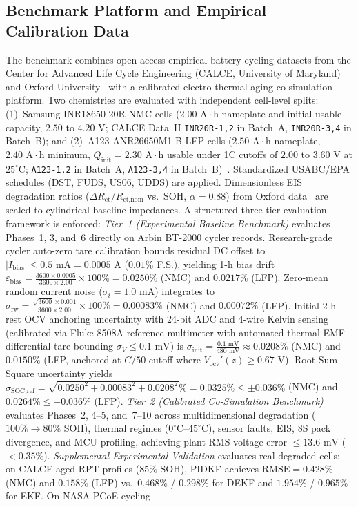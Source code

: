 \documentclass[balance,nocopyright,upint,varvw,hyphenate,barcolor=NavyBlue,nolists]{asmejour}
\begin{document}
\subsection{Benchmark Platform and Empirical Calibration Data}
The benchmark combines open-access empirical battery cycling datasets from the Center for Advanced Life Cycle Engineering (CALCE, University of Maryland)~\cite{Pecht2011calce} and Oxford University~\cite{Birkl2017diagnostics} with a calibrated electro-thermal-aging co-simulation platform. Two chemistries are evaluated with independent cell-level splits: (1)~Samsung INR18650-20R NMC cells ($2.00\text{ A}\cdot\text{h}$ nameplate and initial usable capacity, $2.50$ to $4.20\text{ V}$; CALCE Data~II \texttt{INR20R-1,2} in Batch~A, \texttt{INR20R-3,4} in Batch~B); and (2)~A123 ANR26650M1-B LFP cells ($2.50\text{ A}\cdot\text{h}$ nameplate, $2.40\text{ A}\cdot\text{h}$ minimum, $Q_{\text{init}} = \allowbreak 2.30\text{ A}\cdot\text{h}$ usable under 1C cutoffs of $2.00$ to $3.60\text{ V}$ at $25^\circ\text{C}$; \texttt{A123-1,2} in Batch~A, \texttt{A123-3,4} in Batch~B)~\cite{He2011ecm,Pecht2011calce}. Standardized USABC/EPA schedules (DST, FUDS, US06, UDDS) are applied. Dimensionless EIS degradation ratios ($\Delta R_{\text{ct}}/\allowbreak R_{\text{ct,nom}}$ vs.\ SOH, $\alpha=0.88$) from Oxford data~\cite{Birkl2017diagnostics} are scaled to cylindrical baseline impedances. A structured three-tier evaluation framework is enforced: \emph{Tier~1 (Experimental Baseline Benchmark)} evaluates Phases~1, 3, and~6 directly on Arbin BT-2000 cycler records. Research-grade cycler auto-zero tare calibration bounds residual DC offset to $|I_{\text{bias}}| \le 0.5\text{ mA} = 0.0005\text{ A}$ ($0.01\%$ F.S.), yielding 1-h bias drift $\varepsilon_{\text{bias}} = \frac{3600 \times 0.0005}{3600 \times 2.00} \times 100\% = 0.0250\%$ (NMC) and $0.0217\%$ (LFP). Zero-mean random current noise ($\sigma_i = 1.0\text{ mA}$) integrates to $\sigma_{\text{rw}} = \frac{\sqrt{3600} \times 0.001}{3600 \times 2.00} \times 100\% = 0.00083\%$ (NMC) and $0.00072\%$ (LFP). Initial 2-h rest OCV anchoring uncertainty with 24-bit ADC and 4-wire Kelvin sensing (calibrated via Fluke 8508A reference multimeter with automated thermal-EMF differential tare bounding $\sigma_V \le 0.1\text{ mV}$) is $\sigma_{\text{init}} = \frac{0.1\text{ mV}}{480\text{ mV}} \approx 0.0208\%$ (NMC) and $0.0150\%$ (LFP, anchored at $C/50$ cutoff where $V_{\text{ocv}}'(z) \ge 0.67\text{ V}$). Root-Sum-Square uncertainty yields $\sigma_{\text{SOC,ref}} = \sqrt{0.0250^2 + 0.00083^2 + 0.0208^2}\% = 0.0325\% \le \pm 0.036\%$ (NMC) and $0.0264\% \le \pm 0.036\%$ (LFP). \emph{Tier~2 (Calibrated Co-Simulation Benchmark)} evaluates Phases~2, 4--5, and~7--10 across multidimensional degradation ($100\%\to 80\%$ SOH), thermal regimes ($0^\circ\text{C}\text{--}45^\circ\text{C}$), sensor faults, EIS, 8S pack divergence, and MCU profiling, achieving plant RMS voltage error $\le 13.6\text{ mV}$ ($<0.35\%$). \emph{Supplemental Experimental Validation} evaluates real degraded cells: on CALCE aged RPT profiles ($85\%$ SOH), PIDKF achieves $\text{RMSE} = 0.428\%$ (NMC) and $0.158\%$ (LFP) vs.\ $0.468\%$ / $0.298\%$ for DEKF and $1.954\%$ / $0.965\%$ for EKF. On NASA PCoE cycling 
\end{document}
